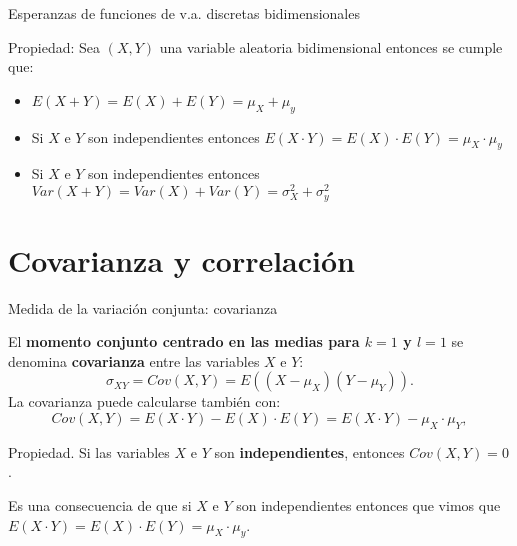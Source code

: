 \documentclass[ignorenonframetext,]{beamer}
\providecommand{\tightlist}{%
  \setlength{\itemsep}{0pt}\setlength{\parskip}{0pt}}
\begin{document}
\begin{frame}{Esperanzas de funciones de v.a. discretas bidimensionales}
\protect\hypertarget{esperanzas-de-funciones-de-v.a.-discretas-bidimensionales-1}{}

 Propiedad: Sea \((X,Y)\) una variable aleatoria bidimensional entonces
se cumple que:

\begin{itemize}
\tightlist
\item
  \(E(X+Y)=E(X)+E(Y)=\mu_X+ \mu_y\)
\item
  Si \(X\) e \(Y\) son independientes entonces
  \(E(X\cdot Y)=E(X)\cdot E(Y)=\mu_X\cdot \mu_y\)
\item
  Si \(X\) e \(Y\) son independientes entonces
  \(Var(X+Y)=Var(X)+ Var(Y)=\sigma_X^2+ \sigma_y^2\)
\end{itemize}

\end{frame}

\hypertarget{covarianza-y-correlaciuxf3n}{%
\section{Covarianza y correlación}\label{covarianza-y-correlaciuxf3n}}

\begin{frame}{Medida de la variación conjunta: covarianza}
\protect\hypertarget{medida-de-la-variaciuxf3n-conjunta-covarianza}{}

El \textbf{momento conjunto centrado en las medias para \(k=1\) y
\(l=1\)} se denomina \textbf{covarianza} entre las variables \(X\) e
\(Y\): \[
\sigma_{XY}=Cov(X,Y)=E((X-\mu_X)(Y-\mu_Y)).
\] La covarianza puede calcularse también con: \[
Cov(X,Y)=E(X\cdot Y)-E(X)\cdot E(Y)=E(X\cdot Y)-\mu_X\cdot \mu_Y,
\]

Propiedad. Si las variables \(X\) e \(Y\) son \textbf{independientes},
entonces \(Cov(X,Y)=0\).

Es una consecuencia de que si \(X\) e \(Y\) son independientes entonces
que vimos que \(E(X\cdot Y)=E(X)\cdot E(Y) =\mu_X\cdot \mu_y\).

\end{frame}
\end{document}
